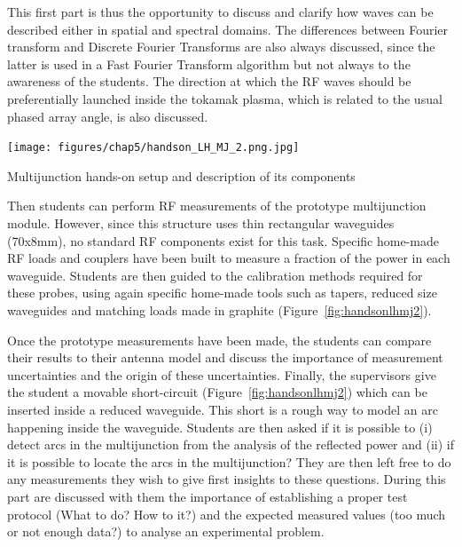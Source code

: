 This first part is thus the opportunity to discuss and clarify how waves can be described either in spatial and spectral domains. The differences between Fourier transform and Discrete Fourier Transforms are also always discussed, since the latter is used in a Fast Fourier Transform algorithm but not always to the awareness of the students. The direction at which the RF waves should be preferentially launched inside the tokamak plasma, which is related to the usual phased array angle, is also discussed.

\begin{marginfigure}
	\centering
	\texttt{[image: figures/chap5/handson\_LH\_MJ\_2.png.jpg]}
	\caption{Multijunction hands-on setup and description of its components}
	\label{fig:handsonlhmj2}
\end{marginfigure}

Then students can perform RF measurements of the prototype multijunction module. However, since this structure uses thin rectangular waveguides (70x8mm), no standard RF components exist for this task. Specific home-made RF loads and couplers have been built to measure a fraction of the power in each waveguide. Students are then guided to the calibration methods required for these probes, using again specific home-made tools such as tapers, reduced size waveguides and matching loads made in graphite (Figure~\ref{fig:handsonlhmj2}).

Once the prototype measurements have been made, the students can compare their results to their antenna model and discuss the importance of measurement uncertainties and the origin of these uncertainties. Finally, the supervisors give the student a movable short-circuit (Figure~\ref{fig:handsonlhmj2}) which can be inserted inside a reduced waveguide. This short is a rough way to model an arc happening inside the waveguide. Students are then asked if it is possible to (i) detect arcs in the multijunction from the analysis of the reflected power and (ii) if it is possible to locate the arcs in the multijunction? They are then left free to do any measurements they wish to give first insights to these questions. During this part are discussed with them the importance of establishing a proper test protocol (What to do? How to it?) and the expected measured values (too much or not enough data?) to analyse an experimental problem.


